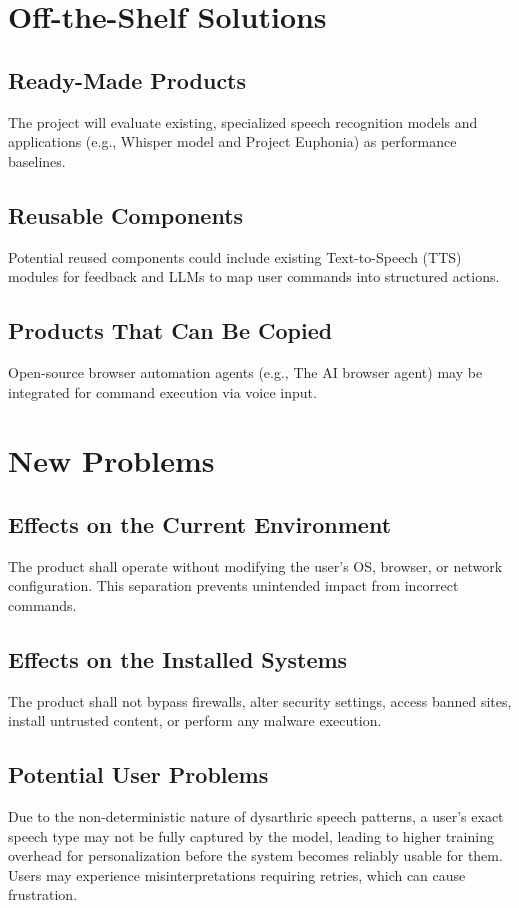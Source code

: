 \documentclass[12pt]{article}
\begin{document}
\section{Off-the-Shelf Solutions}
\subsection{Ready-Made Products}
The project will evaluate existing, specialized speech recognition models and applications (e.g., Whisper model and Project Euphonia) as performance baselines.

\subsection{Reusable Components}
Potential reused components could include existing Text-to-Speech (TTS) modules for feedback and LLMs to map user commands into structured actions.

\subsection{Products That Can Be Copied}
Open-source browser automation agents (e.g., The AI browser agent) may be integrated for command execution via voice input.


\section{New Problems}
\subsection{Effects on the Current Environment}
The product shall operate without modifying the user’s OS, browser, or network configuration. This separation prevents unintended impact from incorrect commands.

\subsection{Effects on the Installed Systems}
The product shall not bypass firewalls, alter security settings, access banned sites, install untrusted content, or perform any malware execution.

\subsection{Potential User Problems}
Due to the non-deterministic nature of dysarthric speech patterns, a user’s exact speech type may not be fully captured by the model, leading to higher training overhead for personalization before the system becomes reliably usable for them. Users may experience misinterpretations requiring retries, which can cause frustration.
\end{document}
